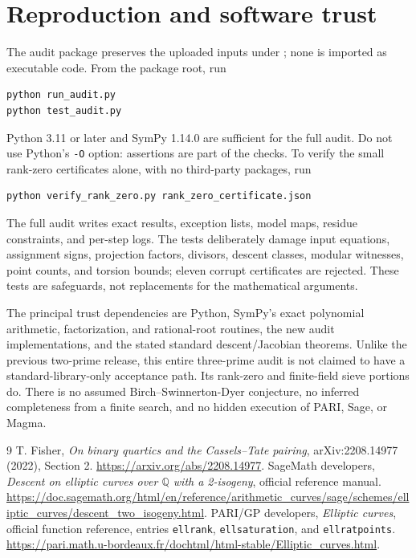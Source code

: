 \documentclass[11pt]{article}
\theoremstyle{remark}\newtheorem{remark}[theorem]{Remark}
\newcommand{\Q}{\mathbb Q}\newcommand{\Z}{\mathbb Z}
\begin{document}
\section{Reproduction and software trust}
The audit package preserves the uploaded inputs under ; none is imported as executable code. From the package root, run
\begin{verbatim}
python run_audit.py
python test_audit.py
\end{verbatim}
Python 3.11 or later and SymPy 1.14.0 are sufficient for the full audit. Do not use Python's \texttt{-O} option: assertions are part of the checks. To verify the small rank-zero certificates alone, with no third-party packages, run
\begin{verbatim}
python verify_rank_zero.py rank_zero_certificate.json
\end{verbatim}
The full audit writes exact results, exception lists, model maps, residue constraints, and per-step logs. The tests deliberately damage input equations, assignment signs, projection factors, divisors, descent classes, modular witnesses, point counts, and torsion bounds; eleven corrupt certificates are rejected. These tests are safeguards, not replacements for the mathematical arguments.

The principal trust dependencies are Python, SymPy's exact polynomial arithmetic, factorization, and rational-root routines, the new audit implementations, and the stated standard descent/Jacobian theorems. Unlike the previous two-prime release, this entire three-prime audit is not claimed to have a standard-library-only acceptance path. Its rank-zero and finite-field sieve portions do. There is no assumed Birch--Swinnerton-Dyer conjecture, no inferred completeness from a finite search, and no hidden execution of PARI, Sage, or Magma.

\begin{thebibliography}{9}
 T. Fisher, \emph{On binary quartics and the Cassels--Tate pairing}, arXiv:2208.14977 (2022), Section 2. \url{https://arxiv.org/abs/2208.14977}.
 SageMath developers, \emph{Descent on elliptic curves over $\Q$ with a 2-isogeny}, official reference manual. \url{https://doc.sagemath.org/html/en/reference/arithmetic_curves/sage/schemes/elliptic_curves/descent_two_isogeny.html}.
 PARI/GP developers, \emph{Elliptic curves}, official function reference, entries \texttt{ellrank}, \texttt{ellsaturation}, and \texttt{ellratpoints}. \url{https://pari.math.u-bordeaux.fr/dochtml/html-stable/Elliptic_curves.html}.
\end{thebibliography}
\end{document}
